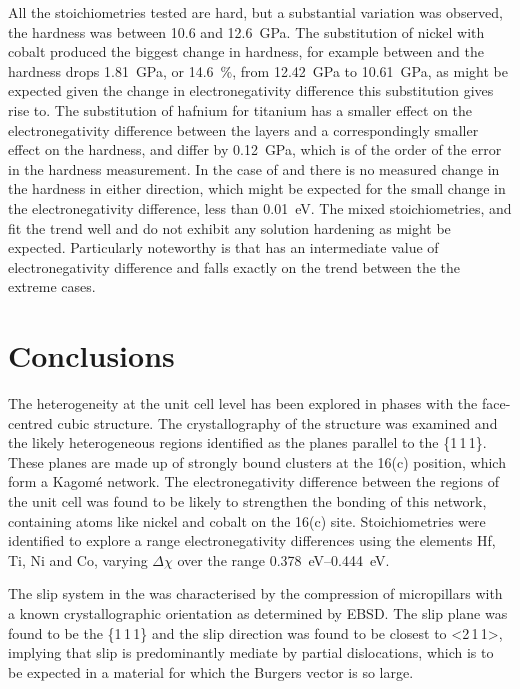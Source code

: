 All the stoichiometries tested are hard, but a substantial variation was observed, the hardness was between \num{10.6} and \SI{12.6}{\giga\pascal}. The substitution of nickel with cobalt produced the biggest change in hardness, for example between  and  the hardness drops \SI{1.81}{\giga\pascal}, or \SI{14.6}{\percent}, from \SI{12.42}{\giga\pascal} to \SI{10.61}{\giga\pascal}, as might be expected given the change in electronegativity difference this substitution gives rise to. The substitution of hafnium for titanium has a smaller effect on the electronegativity difference between the layers and a correspondingly smaller effect on the hardness,  and  differ by \SI{0.12}{\giga\pascal}, which is of the order of the error in the hardness measurement. In the case of  and  there is no measured change in the hardness in either direction, which might be expected for the small change in the electronegativity difference, less than \SI{0.01}{\electronvolt}. The mixed stoichiometries,  and  fit the trend well and do not exhibit any solution hardening as might be expected. Particularly noteworthy is that  has an intermediate value of electronegativity difference and falls exactly on the trend between the the extreme cases.





\section{Conclusions}


The heterogeneity at the unit cell level has been explored in phases with the face-centred cubic  structure. The crystallography of the structure was examined and the likely heterogeneous regions identified as the planes parallel to the \{1\,1\,1\}. These planes are made up of strongly bound clusters at the 16(c) position, which form a Kagom\'{e} network. The electronegativity difference between the regions of the unit cell was found to be likely to strengthen the bonding of this network, containing atoms like nickel and cobalt on the 16(c) site. Stoichiometries were identified to explore a range electronegativity differences using the elements Hf, Ti, Ni and Co, varying $\Delta \chi$ over the range \SIrange{0.378}{0.444}{eV}.

The slip system in the  was characterised by the compression of micropillars with a known crystallographic orientation as determined by EBSD. The slip plane was found to be the \{1\,1\,1\} and the slip direction was found to be closest to <2\,1\,1>, implying that slip is predominantly mediate by partial dislocations, which is to be expected in a material for which the Burgers vector is so large.

